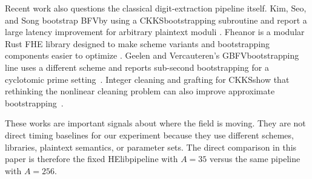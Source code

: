 \documentclass[a4paper,runningheads]{llncs}
\newcommand{\HElib}{\textsf{HElib}}
\newcommand{\BFV}{\textsf{BFV}}
\newcommand{\CKKS}{\textsf{CKKS}}
\newcommand{\GBFV}{\textsf{GBFV}}
\begin{document}
Recent work also questions the classical digit-extraction pipeline itself.
Kim, Seo, and Song bootstrap \BFV by using a \CKKS bootstrapping subroutine
and report a large latency improvement for arbitrary plaintext moduli
\cite{kim_bfv_from_ckks}.  Fheanor is a modular Rust FHE library designed to
make scheme variants and bootstrapping components easier to optimize
\cite{fheanor}.  Geelen and Vercauteren's \GBFV bootstrapping line uses a
different scheme and reports sub-second bootstrapping for a cyclotomic prime
setting~\cite{better_gbfv}.  Integer cleaning and grafting for \CKKS show
that rethinking the nonlinear cleaning problem can also improve approximate
bootstrapping~\cite{choe_integer_cleaning}.

These works are important signals about where the field is moving.  They are
not direct timing baselines for our experiment because they use different
schemes, libraries, plaintext semantics, or parameter sets.  The direct
comparison in this paper is therefore the fixed \HElib pipeline with
$A=35$ versus the same pipeline with $A=256$.
\end{document}
